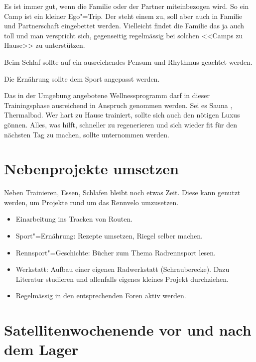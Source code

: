 \documentclass[a4paper,DIV13,BCOR0cm,draft=TRUE]{scrartcl}
\newcommand{\rv}{Rennvelo}
\begin{document}
Es ist immer gut, wenn die Familie oder der Partner miteinbezogen wird.
So ein Camp ist ein kleiner Ego"=Trip. Der steht einem zu, soll aber auch in Familie und Partnerschaft eingebettet werden.
Vielleicht findet die Familie das ja auch toll und man verspricht sich, gegenseitig regelmässig bei solchen <<Camps zu Hause>> zu unterstützen.

Beim Schlaf sollte auf ein ausreichendes Pensum und Rhythmus geachtet werden.

Die Ernährung sollte dem Sport angepasst werden.

Das in der Umgebung angebotene Wellnessprogramm darf in dieser Trainingsphase ausreichend in Anspruch genommen werden.
Sei es Sauna \cite[S. 795]{Weineck2010}, Thermalbad.
Wer hart zu Hause trainiert, sollte sich auch den nötigen Luxus gönnen.
Alles, was hilft, schneller zu regenerieren und sich wieder fit für den nächsten Tag zu machen, sollte unternommen werden.

% 
% 

\section{Nebenprojekte umsetzen}

Neben Trainieren, Essen, Schlafen bleibt noch etwas Zeit.
Diese kann genutzt werden, um Projekte rund um das \rv{} umzusetzen.

\begin{itemize}
        \item Einarbeitung ins Tracken von Routen.
        \item Sport"=Ernährung: Rezepte umsetzen, Riegel selber machen.
        \item Rennsport"=Geschichte: Bücher zum Thema Radrennsport lesen.
        \item Werkstatt: Aufbau einer eigenen Radwerkstatt (Schrauberecke).
                Dazu Literatur studieren und allenfalls eigenes kleines Projekt durchziehen.
        \item Regelmässig in den entsprechenden Foren aktiv werden.
\end{itemize}


\section{Satellitenwochenende vor und nach dem Lager}
\label{sec:satellitenwochenende}
\end{document}
